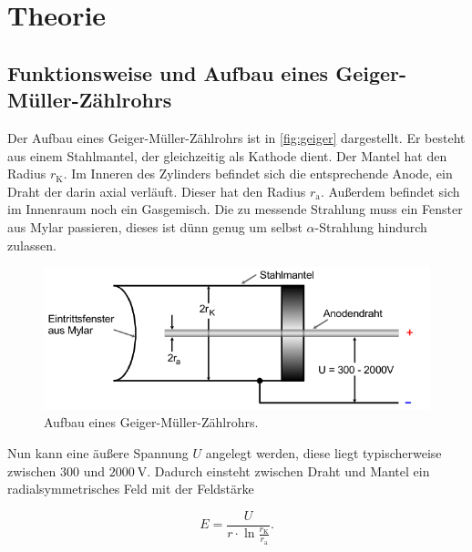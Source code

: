 \section{Theorie}
\label{sec:Theorie}




\subsection{Funktionsweise und Aufbau eines Geiger-Müller-Zählrohrs}
\label{ssec:t1}

Der Aufbau eines Geiger-Müller-Zählrohrs ist in \autoref{fig:geiger} dargestellt.
Er besteht aus einem Stahlmantel, der gleichzeitig als Kathode dient. 
Der Mantel hat den Radius $r_\text{K}$.
Im Inneren des Zylinders befindet sich die entsprechende Anode, ein Draht der darin axial verläuft.
Dieser hat den Radius $r_\text{a}$.
Außerdem befindet sich im Innenraum noch ein Gasgemisch.
Die zu messende Strahlung muss ein Fenster aus Mylar passieren, dieses ist dünn genug um selbst $\alpha$-Strahlung hindurch zulassen.

\begin{figure}
    \centering
    \includegraphics[width=\textwidth]{images/bild2.png}
    \caption{Aufbau eines Geiger-Müller-Zählrohrs. \cite{V703}}
    \label{fig:geiger}
\end{figure}

Nun kann eine äußere Spannung $U$ angelegt werden, diese liegt typischerweise zwischen $300$ und $\SI{2000}{\volt}$.
Dadurch einsteht zwischen Draht und Mantel ein radialsymmetrisches Feld mit der Feldstärke 

\begin{equation}
    E = \frac{U}{r \cdot \ln{\frac{r_\text{K}}{r_\text{a}}}}.
    \label{eq:energie}
\end{equation}


